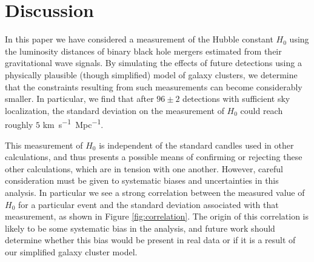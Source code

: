\section{Discussion} \label{sec:conclusions}

In this paper we have considered a measurement of the Hubble constant $H_0$ using the luminosity distances of binary black hole mergers estimated from their gravitational wave signals.
By simulating the effects of future detections using a physically plausible (though simplified) model of galaxy clusters, we determine that the constraints resulting from such measurements can become considerably smaller.
In particular, we find that after $96\pm 2$ detections with sufficient sky localization, the standard deviation on the measurement of $H_0$ could reach roughly $5$ \si{km.s^{-1}.Mpc^{-1}}.

This measurement of $H_0$ is independent of the standard candles used in other calculations, and thus presents a possible means of confirming or rejecting these other calculations, which are in tension with one another.
However, careful consideration must be given to systematic biases and uncertainties in this analysis.
In particular we see a strong correlation between the measured value of $H_0$ for a particular event and the standard deviation associated with that measurement, as shown in Figure \ref{fig:correlation}.
The origin of this correlation is likely to be some systematic bias in the analysis, and future work should determine whether this bias would be present in real data or if it is a result of our simplified galaxy cluster model.




